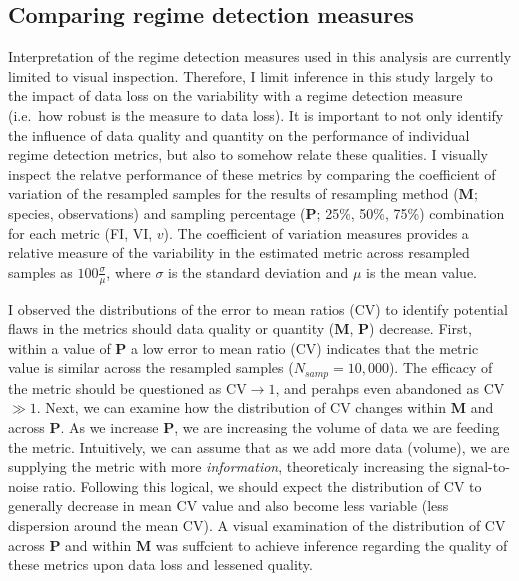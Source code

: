 \documentclass[12pt,twoside,openany]{reedthesis}
\begin{document}
\hypertarget{comparing-regime-detection-measures}{%
\subsection{Comparing regime detection measures}\label{comparing-regime-detection-measures}}

Interpretation of the regime detection measures used in this analysis are currently limited to visual inspection. Therefore, I limit inference in this study largely to the impact of data loss on the variability with a regime detection measure (i.e.~how robust is the measure to data loss). It is important to not only identify the influence of data quality and quantity on the performance of individual regime detection metrics, but also to somehow relate these qualities. I visually inspect the relatve performance of these metrics by comparing the coefficient of variation of the resampled samples for the results of resampling method (\(\textbf{M}\); species, observations) and sampling percentage (\(\textbf{P}\); 25\%, 50\%, 75\%) combination for each metric (FI, VI, \(v\)). The coefficient of variation measures provides a relative measure of the variability in the estimated metric across resampled samples as \(100\frac{\sigma}{\mu}\), where \(\sigma\) is the standard deviation and \(\mu\) is the mean value.

I observed the distributions of the error to mean ratios (CV) to identify potential flaws in the metrics should data quality or quantity (\(\textbf{M}\), \(\textbf{P}\)) decrease. First, within a value of \(\textbf{P}\) a low error to mean ratio (CV) indicates that the metric value is similar across the resampled samples (\(N_{samp}=10,000\)). The efficacy of the metric should be questioned as CV\(\rightarrow 1\), and perahps even abandoned as CV\(\gg1\). Next, we can examine how the distribution of CV changes within \(\textbf{M}\) and across \(\textbf{P}\). As we increase \(\textbf{P}\), we are increasing the volume of data we are feeding the metric. Intuitively, we can assume that as we add more data (volume), we are supplying the metric with more \emph{information}, theoreticaly increasing the signal-to-noise ratio. Following this logical, we should expect the distribution of CV to generally decrease in mean CV value and also become less variable (less dispersion around the mean CV). A visual examination of the distribution of CV across \(\textbf{P}\) and within \(\textbf{M}\) was suffcient to achieve inference regarding the quality of these metrics upon data loss and lessened quality.
\end{document}
